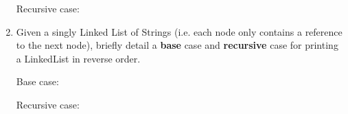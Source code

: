 \documentclass[addpoints]{exam}
\begin{document}
\begin{enumerate}
\begin{oneparchoices}
 \vspace{1em}\newline
 \choice Recursive case:   \newline


 \end{oneparchoices}
 
  \item {}
Given a singly Linked List of Strings (i.e. each node only contains a reference to the next node), briefly detail a \textbf{base} case and \textbf{recursive} case for printing a LinkedList in reverse order.

\begin{oneparchoices} 
\hspace{0.2cm}
 \vspace{2em}
 \choice Base case: 

 \vspace{1em}\newline
 \choice Recursive case: 
 
 \newline \newline
 
\end{oneparchoices}
\vspace{2em}
\end{enumerate}
\end{document}
